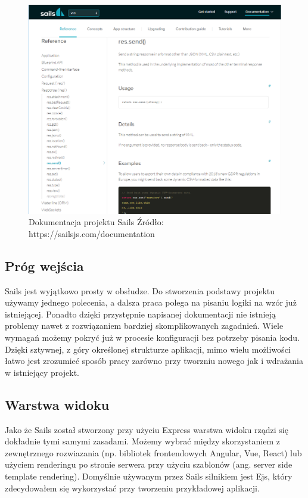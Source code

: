 \documentclass[12pt]{report}
\begin{document}
      \begin{figure}[H]
        \centering
        \includegraphics[width=\textwidth,height=\textheight,keepaspectratio]{doc_sails.png} 
        \caption{Dokumentacja projektu Sails \newline Źródło: https://sailsjs.com/documentation}
      \end{figure}

    \subsection{Próg wejścia}
      Sails jest wyjątkowo prosty w obsłudze.
      Do stworzenia podstawy projektu używamy jednego polecenia, a dalsza praca polega na pisaniu logiki na wzór już istniejącej.
      Ponadto dzięki przystępnie napisanej dokumentacji nie istnieją problemy nawet z rozwiązaniem bardziej skomplikowanych zagadnień.
      Wiele wymagań możemy pokryć już w procesie konfiguracji bez potrzeby pisania kodu.
      Dzięki sztywnej, z góry określonej strukturze aplikacji, mimo wielu możliwości łatwo jest zrozumieć sposób pracy zarówno przy tworzniu nowego jak i wdrażania w istniejący projekt. 

    \subsection{Warstwa widoku}
      Jako że Sails został stworzony przy użyciu Express warstwa widoku rządzi się dokładnie tymi samymi zasadami.
      Możemy wybrać między skorzystaniem z zewnętrznego rozwiazania (np. bibliotek frontendowych Angular, Vue, React) lub użyciem renderingu po stronie serwera przy użyciu szablonów (ang. server side template rendering).
      Domyślnie używanym przez Sails silnikiem jest Ejs, który zdecydowałem się wykorzystać przy tworzeniu przykładowej aplikacji.
\end{document}
